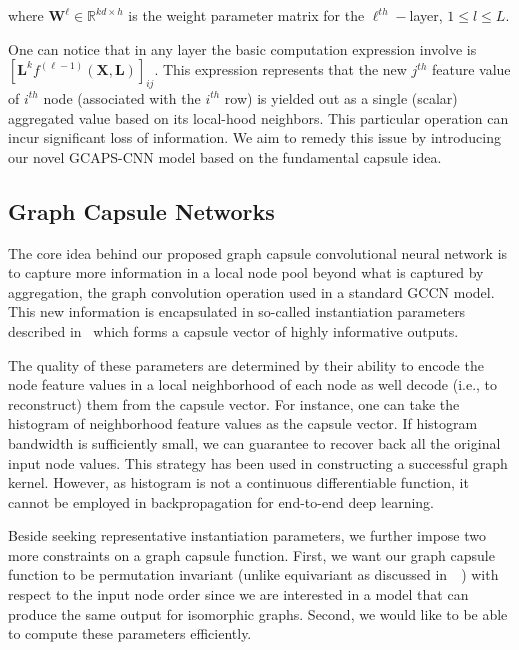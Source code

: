 \documentclass{article}
\begin{document}
where $\mathbf{W}^{\ell} \in \mathbb{R}^{kd \times h}$ is the  weight parameter matrix for the $\ell^{th}-$layer, $1 \leq l \leq L$.

One can notice that in any layer the basic computation expression involve is $[\mathbf{L}^{k}f^{(\ell-1)}(\mathbf{X}, \mathbf{L})]_{ij}$. This expression represents that the new $j^{th}$ feature value of  $i^{th}$ node  (associated   with the $i^{th}$ row)  is yielded out as a single (scalar) aggregated value based on its local-hood neighbors. This particular operation can   incur significant loss of information. We aim to remedy this issue by introducing our novel GCAPS-CNN model based on   the fundamental capsule idea.



\subsection{Graph Capsule Networks}\label{sec:graph_capsule}


The core idea behind our proposed graph capsule convolutional neural network is to   capture more information in a local node pool  beyond what is captured by aggregation, the graph convolution operation used in a standard GCCN model. This new information is encapsulated in so-called  instantiation parameters described in~\cite{hinton2011transforming} which forms a capsule vector of highly informative outputs. 

The quality of these  parameters are determined by their ability to encode the node feature values in a local neighborhood of each node  as well decode (i.e., to reconstruct) them from the capsule vector. For instance, one can take the histogram of neighborhood feature values as the  capsule vector. If histogram bandwidth is sufficiently small, we can guarantee to recover back  all the original input node   values. This strategy has been used  in constructing a successful graph kernel. However, as histogram is not a continuous differentiable function, it cannot be employed in backpropagation for  end-to-end deep learning.

Beside seeking representative instantiation parameters, we further impose two  more constraints on a graph capsule function. First, we  want our graph capsule function to be  permutation invariant (unlike equivariant as discussed in~~\cite{hinton2011transforming})  with respect to the input node order since  we are interested in a model that can produce the same output for isomorphic graphs.  Second,  we would like   to be able to compute these parameters efficiently.
\end{document}

